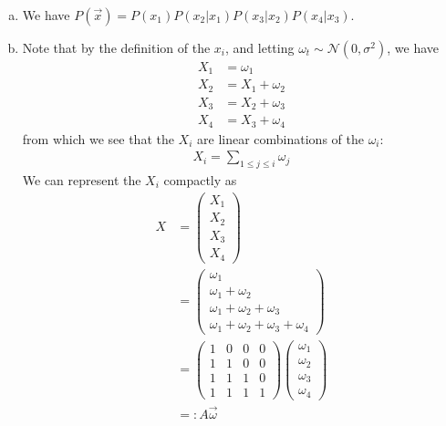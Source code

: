 \documentclass{mathnotes-linalg}
\newcommand{\normal}[2]{\mathcal N \left ( #1, #2 \right )}
\begin{document}
\begin{exe}\
\begin{enumerate}[(a)]
	\item 
		We have $P(\vec x) = P(x_1)P(x_2 | x_1) P (x_3 | x_2) P(x_4 | x_3)$.

	\item 
		Note that by the definition of the $x_i$, and letting $\omega_t \sim \normal 0 {\sigma^2}$, we have
		\begin{align*}
			X_1 &= \omega_1\\
			X_2 &= X_1 + \omega_2\\
			X_3 &= X_2 + \omega_3\\
			X_4 &= X_3 + \omega_4
		\end{align*}
		from which we see that the $X_i$ are linear combinations of the $\omega_i$:
		\begin{align*}
			X_i = \sum_{1 \leq j \leq i} \omega_j
		\end{align*}
		We can represent the $X_i$ compactly as
		\begin{align*}
			X &= \begin{pmatrix}
				X_1 \\ X_2 \\ X_3 \\ X_4
			\end{pmatrix}\\
			&= \begin{pmatrix}
				\omega_1 \\ \omega_1 + \omega_2 \\  \omega_1 + \omega_2 + \omega_3 \\ \omega_1 + \omega_2 + \omega_3 + \omega_4
			\end{pmatrix}\\
			&= \begin{pmatrix}
				1 & 0 & 0 & 0 \\
				1 & 1 & 0 & 0 \\
				1 & 1 & 1 & 0 \\
				1 & 1 & 1 & 1
			\end{pmatrix}
			\begin{pmatrix}
				\omega_1\\
				\omega_2\\
				\omega_3\\
				\omega_4
			\end{pmatrix}\\
			&=: A \vec \omega
		\end{align*}


\end{enumerate}
\end{exe}
\end{document}
